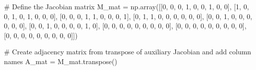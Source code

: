 \documentclass[
  letterpaper,
  DIV=11,
  numbers=noendperiod]{scrreprt}
\newenvironment{Shaded}{\begin{snugshade}}{\end{snugshade}}
\newcommand{\CommentTok}[1]{\textcolor[rgb]{0.37,0.37,0.37}{#1}}
\newcommand{\DecValTok}[1]{\textcolor[rgb]{0.68,0.00,0.00}{#1}}
\newcommand{\NormalTok}[1]{\textcolor[rgb]{0.00,0.23,0.31}{#1}}
\newcommand{\OperatorTok}[1]{\textcolor[rgb]{0.37,0.37,0.37}{#1}}
\begin{document}
\begin{tcolorbox}
\begin{Shaded}
\begin{Highlighting}[]
\CommentTok{\# Define the Jacobian matrix}
\NormalTok{M\_mat }\OperatorTok{=}\NormalTok{ np.array([[}\DecValTok{0}\NormalTok{, }\DecValTok{0}\NormalTok{, }\DecValTok{0}\NormalTok{, }\DecValTok{1}\NormalTok{, }\DecValTok{0}\NormalTok{, }\DecValTok{0}\NormalTok{, }\DecValTok{1}\NormalTok{, }\DecValTok{0}\NormalTok{, }\DecValTok{0}\NormalTok{],}
\NormalTok{                  [}\DecValTok{1}\NormalTok{, }\DecValTok{0}\NormalTok{, }\DecValTok{0}\NormalTok{, }\DecValTok{1}\NormalTok{, }\DecValTok{0}\NormalTok{, }\DecValTok{1}\NormalTok{, }\DecValTok{0}\NormalTok{, }\DecValTok{0}\NormalTok{, }\DecValTok{0}\NormalTok{],}
\NormalTok{                  [}\DecValTok{0}\NormalTok{, }\DecValTok{0}\NormalTok{, }\DecValTok{0}\NormalTok{, }\DecValTok{1}\NormalTok{, }\DecValTok{1}\NormalTok{, }\DecValTok{0}\NormalTok{, }\DecValTok{0}\NormalTok{, }\DecValTok{0}\NormalTok{, }\DecValTok{1}\NormalTok{],}
\NormalTok{                  [}\DecValTok{0}\NormalTok{, }\DecValTok{1}\NormalTok{, }\DecValTok{1}\NormalTok{, }\DecValTok{0}\NormalTok{, }\DecValTok{0}\NormalTok{, }\DecValTok{0}\NormalTok{, }\DecValTok{0}\NormalTok{, }\DecValTok{0}\NormalTok{, }\DecValTok{0}\NormalTok{],}
\NormalTok{                  [}\DecValTok{0}\NormalTok{, }\DecValTok{0}\NormalTok{, }\DecValTok{1}\NormalTok{, }\DecValTok{0}\NormalTok{, }\DecValTok{0}\NormalTok{, }\DecValTok{0}\NormalTok{, }\DecValTok{0}\NormalTok{, }\DecValTok{0}\NormalTok{, }\DecValTok{0}\NormalTok{],}
\NormalTok{                  [}\DecValTok{0}\NormalTok{, }\DecValTok{0}\NormalTok{, }\DecValTok{1}\NormalTok{, }\DecValTok{0}\NormalTok{, }\DecValTok{0}\NormalTok{, }\DecValTok{0}\NormalTok{, }\DecValTok{0}\NormalTok{, }\DecValTok{1}\NormalTok{, }\DecValTok{0}\NormalTok{],}
\NormalTok{                  [}\DecValTok{0}\NormalTok{, }\DecValTok{0}\NormalTok{, }\DecValTok{0}\NormalTok{, }\DecValTok{0}\NormalTok{, }\DecValTok{0}\NormalTok{, }\DecValTok{0}\NormalTok{, }\DecValTok{0}\NormalTok{, }\DecValTok{0}\NormalTok{, }\DecValTok{0}\NormalTok{],}
\NormalTok{                  [}\DecValTok{0}\NormalTok{, }\DecValTok{0}\NormalTok{, }\DecValTok{0}\NormalTok{, }\DecValTok{0}\NormalTok{, }\DecValTok{0}\NormalTok{, }\DecValTok{0}\NormalTok{, }\DecValTok{0}\NormalTok{, }\DecValTok{0}\NormalTok{, }\DecValTok{0}\NormalTok{],}
\NormalTok{                  [}\DecValTok{0}\NormalTok{, }\DecValTok{0}\NormalTok{, }\DecValTok{0}\NormalTok{, }\DecValTok{0}\NormalTok{, }\DecValTok{0}\NormalTok{, }\DecValTok{0}\NormalTok{, }\DecValTok{0}\NormalTok{, }\DecValTok{0}\NormalTok{, }\DecValTok{0}\NormalTok{]])}

\CommentTok{\# Create adjacency matrix from transpose of auxiliary Jacobian and add column names}
\NormalTok{A\_mat }\OperatorTok{=}\NormalTok{ M\_mat.transpose()}


\end{Highlighting}
\end{Shaded}
\end{tcolorbox}
\end{document}
